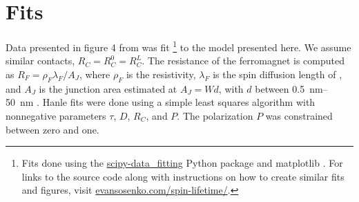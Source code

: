 \section{Fits}
\label{s:fits}

Data presented in figure 4 from \cite{PhysRevLett.105.167202}
was fit
\footnote{
  Fits done using the
  \href{https://github.com/razor-x/scipy-data_fitting}{scipy-data\_fitting}
  Python package and matplotlib \cite{Hunter:2007}.
  For links to the source code along with instructions
  on how to create similar fits and figures, visit
  \href{http://evansosenko.com/spin-lifetime/}{evansosenko.com/spin-lifetime/}.
}
to the model presented here.
We assume similar contacts, $R_C = R_C^0 = R_C^L$.
The resistance of the ferromagnet  is computed as
$R_F = ρ_F λ_F / A_J$,
where $ρ_F$ is the  resistivity,
$λ_F$ is the spin diffusion length of ,
and $A_J$ is the junction area estimated at $A_J = W d$,
with $d$ between \SIrange[range-phrase={ and }]{0.5}{50}{\nano \meter}
\cite{PhysRevLett.105.167202}.
Hanle fits were done using a simple least squares algorithm
with nonnegative parameters $τ$, $D$, $R_C$, and $P$.
The polarization $P$ was constrained between zero and one.

